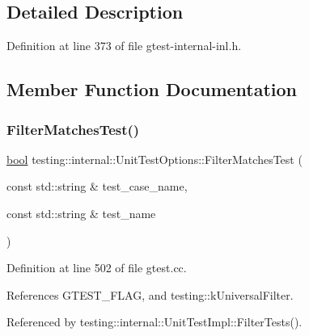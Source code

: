 \subsection{Detailed Description}


Definition at line 373 of file gtest-\/internal-\/inl.\+h.



\subsection{Member Function Documentation}
\mbox{\label{classtesting_1_1internal_1_1UnitTestOptions_a9975b59cece94874b303421697e3bca6}} 
\subsubsection{\texorpdfstring{Filter\+Matches\+Test()}{FilterMatchesTest()}}
{\footnotesize\ttfamily \hyperlink{classbool}{bool} testing\+::internal\+::\+Unit\+Test\+Options\+::\+Filter\+Matches\+Test (\begin{DoxyParamCaption}\item[{const std\+::string \&}]{test\+\_\+case\+\_\+name,  }\item[{const std\+::string \&}]{test\+\_\+name }\end{DoxyParamCaption})\hspace{0.3cm}{\ttfamily [static]}}



Definition at line 502 of file gtest.\+cc.



References G\+T\+E\+S\+T\+\_\+\+F\+L\+AG, and testing\+::k\+Universal\+Filter.



Referenced by testing\+::internal\+::\+Unit\+Test\+Impl\+::\+Filter\+Tests().


